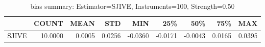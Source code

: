 \begin{table}[ht]
\centering
\caption{bias summary: Estimator=SJIVE, Instruments=100, Strength=0.50}
\begin{tabular}{lrrrrrrrr}
\toprule
 & COUNT & MEAN & STD & MIN & 25\% & 50\% & 75\% & MAX \\
\midrule
SJIVE & 10.0000 & 0.0005 & 0.0256 & -0.0360 & -0.0171 & -0.0043 & 0.0165 & 0.0395 \\
\bottomrule
\end{tabular}
\end{table}
